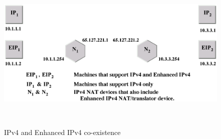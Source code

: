 \begin{figure}[H]
\includegraphics[height=3.0in]{images/EnIPnodes.eps}
\caption{IPv4 and Enhanced IPv4 co-existence}
\label{Figure 2}
\end{figure}


